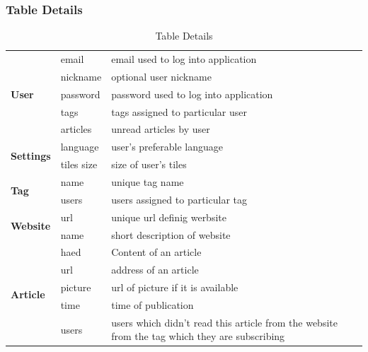 \documentclass[12pt]{article}
\begin{document}
\subsubsection{Table Details}

\begin{table}[H]
\centering
	\begin{tabular}{|p{3cm}|p{3cm}||p{7cm}|} \hline
		\rowcolor{red!20!yellow!30!orange} \multicolumn{3}{|c|}{\textbf{AttomAddict Table Details}} \\ \hline \hline
		\multirow{5}{*}{\textbf{User}} 	 
								&	email	 	& 		email used to log into application		 \\ \cline{2-3}
								&	nickname	& 		optional user nickname						 \\ \cline{2-3}
								&	password	& 		password used to log into application		\\	\cline{2-3}
								& 	tags		&		tags assigned to particular user			\\ 	\cline{2-3}
								&	articles	&		unread articles by user						\\ 	\hline
		\multirow{2}{*}{\textbf{Settings}}
								&	language	&		user's preferable language					\\	\cline{2-3}
								&	tiles size	&		size of user's tiles						\\	\hline
		\multirow{2}{*}{\textbf{Tag}}
								&	name		&		unique tag name								\\ \cline{2-3}
								&	users		&		users assigned to particular tag			\\ \hline
		\multirow{2}{*}{\textbf{Website}}
								&	url			&		unique url definig werbsite					\\	\cline{2-3}
								&	name		&		short description of website				\\ 	\hline
		\multirow{5}{*}{\textbf{Article}}
								&	haed		&		Content of an article						\\	\cline{2-3}
								&	url			&		address of an article						\\	\cline{2-3}
								&	picture		&		url of picture if it is available			\\	\cline{2-3}
								&	time		&		time of publication							\\	\cline{2-3}
								&	users		&		users which didn't read this article from the website from the tag which they are subscribing 			\\ \hline

	\end{tabular}
	\caption{Table Details}
	\label{tab:tableDetails}
\end{table}
\end{document}
